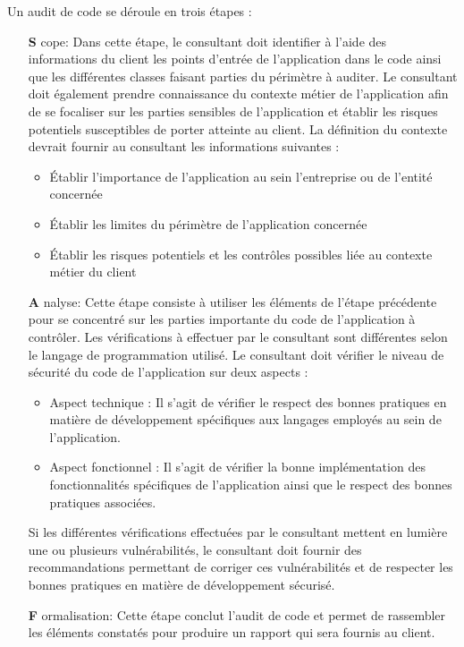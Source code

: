 \documentclass[twoside,a4paper,12pt,titlepage]{book}
\begin{document}
Un audit de code se déroule en trois étapes :\begin{itemize}
\item[\textbf{S}]cope: 
Dans cette étape, le consultant doit identifier à l’aide des informations du client les points d’entrée de l’application dans le code ainsi que les différentes classes faisant parties du périmètre à auditer. Le consultant doit également prendre connaissance du contexte métier de l’application afin de se focaliser sur les parties sensibles de l’application et établir les risques potentiels susceptibles de porter atteinte au client.
La définition du contexte devrait fournir au consultant les informations suivantes :\begin{itemize}
\item Établir l'importance de l’application au sein l'entreprise ou de l’entité concernée
\item Établir les limites du périmètre de l’application concernée
\item Établir les risques potentiels et les contrôles possibles liée au contexte métier du client
\end{itemize}
\item[\textbf{A}]nalyse: 
Cette étape consiste à  utiliser les éléments de l’étape précédente pour se concentré sur les parties importante du code de l’application à contrôler. Les vérifications à effectuer par le consultant sont différentes selon le langage de programmation utilisé. Le consultant doit vérifier le niveau de sécurité du code de l’application sur deux aspects :\begin{itemize}
\item Aspect technique :
 Il s’agit de vérifier le respect des bonnes pratiques en matière de développement spécifiques aux langages employés au sein de l’application. 
\item Aspect fonctionnel :
 Il s’agit de vérifier la bonne implémentation des fonctionnalités spécifiques de l’application ainsi que le respect 					des bonnes pratiques associées.
\end{itemize}
Si les différentes vérifications effectuées par le consultant mettent en lumière une ou plusieurs vulnérabilités, le consultant doit fournir des recommandations permettant de corriger ces vulnérabilités  et de respecter les bonnes pratiques en matière de développement sécurisé.
\item[\textbf{F}]ormalisation: Cette étape conclut l’audit de code et permet de rassembler les éléments constatés pour produire un rapport qui sera fournis au client.
\end{itemize}
\end{document}
